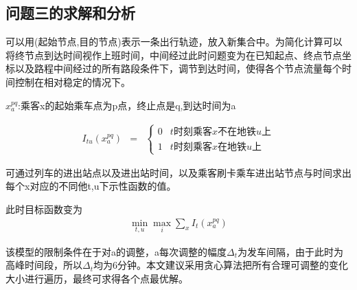 \documentclass[12pt,a4paper]{mcmthesis}
\begin{document}
    \subsection{问题三的求解和分析}

    可以用(起始节点,目的节点)表示一条出行轨迹，放入新集合中。为简化计算可以将终节点到达时间视作上班时间，中间经过此时问题变为在已知起点、终点节点坐标以及路程中间经过的所有路段条件下，调节到达时间，使得各个节点流量每个时间控制在相对稳定的情况下。

    $x_{a}^{pq}$:乘客x的起始乘车点为p点，终止点是q,到达时间为a

    \begin{eqnarray}
        I_{tu}(x_{a}^{pq}) & = & \left\{\begin{matrix}
                                            0& t时刻乘客x不在地铁u上 \\
                                            1& t时刻乘客x在地铁u上
        \end{matrix}\right.
    \end{eqnarray}

    可通过列车的进出站点以及进出站时间，以及乘客刷卡乘车进出站节点与时间求出每个x对应的不同他t,u下示性函数的值。

    此时目标函数变为
    \begin{align}
        \min_{t,u}\max_{i} \sum_{x} I_{t}(x_{a}^{pq})
    \end{align}

    该模型的限制条件在于对a的调整，a每次调整的幅度$\Delta _{t}$为发车间隔，由于此时为高峰时间段，所以$\Delta _{t}$均为6分钟。本文建议采用贪心算法把所有合理可调整的变化大小进行遍历，最终可求得各个点最优解。
\end{document}
